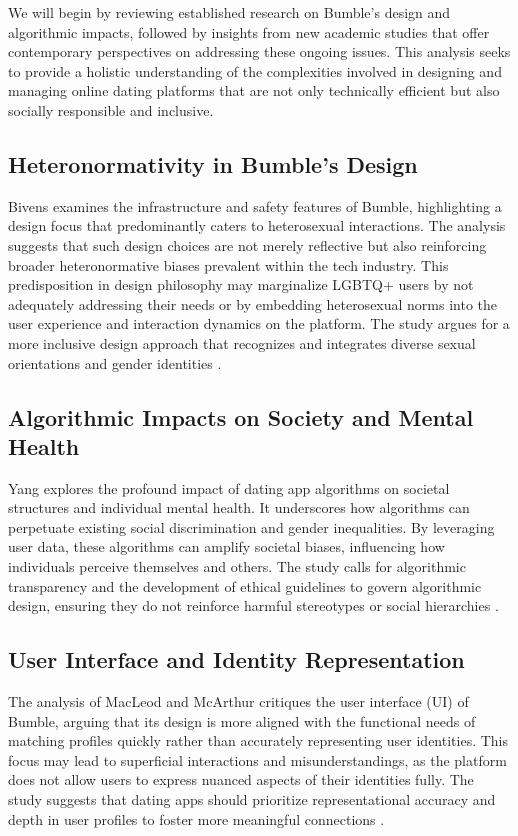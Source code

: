 We will begin by reviewing established research on Bumble's design and algorithmic impacts, followed by insights from new academic studies that offer contemporary perspectives on addressing these ongoing issues. This analysis seeks to provide a holistic understanding of the complexities involved in designing and managing online dating platforms that are not only technically efficient but also socially responsible and inclusive.

\subsection{Heteronormativity in Bumble's Design}
Bivens examines the infrastructure and safety features of Bumble, highlighting a design focus that predominantly caters to heterosexual interactions. The analysis suggests that such design choices are not merely reflective but also reinforcing broader heteronormative biases prevalent within the tech industry. This predisposition in design philosophy may marginalize LGBTQ+ users by not adequately addressing their needs or by embedding heterosexual norms into the user experience and interaction dynamics on the platform. The study argues for a more inclusive design approach that recognizes and integrates diverse sexual orientations and gender identities \cite{Bivens_Hoque_2018}.

\subsection{Algorithmic Impacts on Society and Mental Health}
Yang explores the profound impact of dating app algorithms on societal structures and individual mental health. It underscores how algorithms can perpetuate existing social discrimination and gender inequalities. By leveraging user data, these algorithms can amplify societal biases, influencing how individuals perceive themselves and others. The study calls for algorithmic transparency and the development of ethical guidelines to govern algorithmic design, ensuring they do not reinforce harmful stereotypes or social hierarchies \cite{Yang_2021}.

\subsection{User Interface and Identity Representation}
The analysis of MacLeod and McArthur critiques the user interface (UI) of Bumble, arguing that its design is more aligned with the functional needs of matching profiles quickly rather than accurately representing user identities. This focus may lead to superficial interactions and misunderstandings, as the platform does not allow users to express nuanced aspects of their identities fully. The study suggests that dating apps should prioritize representational accuracy and depth in user profiles to foster more meaningful connections \cite{MacLeod_McArthur_2019}.

